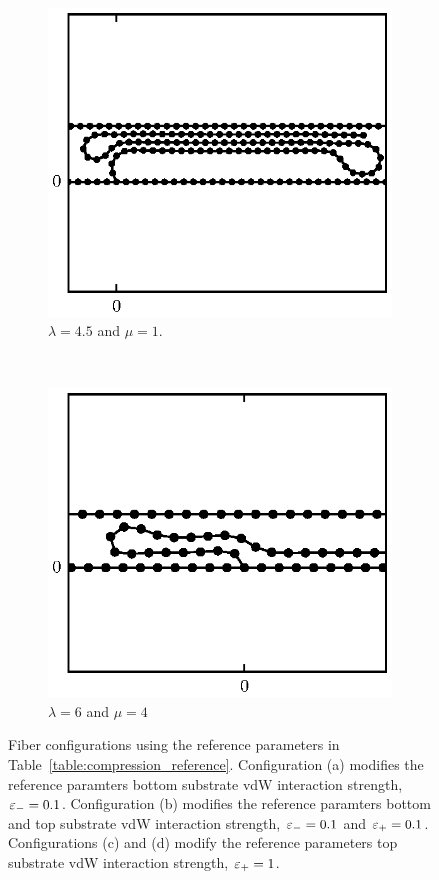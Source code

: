 \begin{figure}
		\begin{subfigure}{.5\textwidth}
			\centering
			\includegraphics{./fig/ch3/push/et0.1/l4.5_m1.eps}
			\caption{$\lambda=4.5$ and $\mu=1$.\label{subfig:bridge}}
		\end{subfigure}%
		~
		\begin{subfigure}{.5\textwidth}
			\centering
			\includegraphics{./fig/ch3/push/et0.1/l6_m4.eps}
			\caption{$\lambda=6$ and $\mu=4$\label{subfig:hump}}
		\end{subfigure}	
		\caption{Fiber configurations using the reference parameters in Table~\ref{table:compression_reference}. Configuration (a) modifies the reference paramters bottom substrate vdW interaction strength, $\varepsilon_-=0.1$. Configuration (b) modifies the reference paramters bottom and top substrate vdW interaction strength, $\varepsilon_-=0.1$ and $\varepsilon_+=0.1$. Configurations (c) and (d) modify the reference parameters top substrate vdW interaction strength, $\varepsilon_+=1$.\label{fig:vdw_crushed}}	
	\end{figure}

